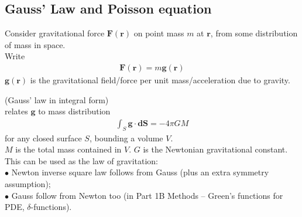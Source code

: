 \documentclass[a4paper]{article}
\begin{document}
\subsection{Gauss' Law and Poisson equation}
Consider gravitational force $\mathbf{F}\left(\mathbf{r}\right)$ on point mass $m$ at $\mathbf{r}$, from some distribution of mass in space.\\
Write 
\begin{equation*}
\begin{aligned}
\mathbf{F}\left(\mathbf{r}\right)=m\mathbf{g}\left(\mathbf{r}\right)
\end{aligned}
\end{equation*}
$\mathbf{g}\left(\mathbf{r}\right)$ is the gravitational field/force per unit mass/acceleration due to gravity.\\

\begin{thm} (Gauss' law in integral form)\\
relates $\mathbf{g}$ to mass distribution
\begin{equation*}
\begin{aligned}
\int_S \mathbf{g}\cdot\mathbf{dS}=-4\pi GM
\end{aligned}
\end{equation*}
for any closed surface $S$, bounding a volume $V$.\\
$M$ is the total mass contained in $V$. $G$ is the Newtonian gravitational constant.
This can be used as the law of gravitation:\\
$\bullet$ Newton inverse square law follows from Gauss (plus an extra symmetry assumption);\\
$\bullet$ Gauss follow from Newton too (in Part 1B Methods -- Green's functions for PDE, $\delta$-functions).
\end{thm}
\end{document}
